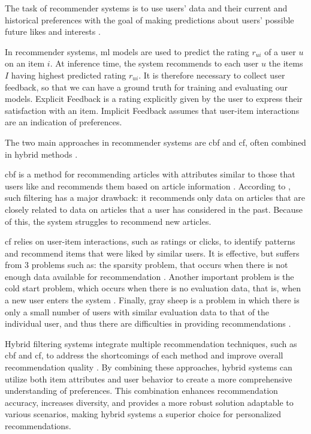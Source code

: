 The task of recommender systems is to use users' data and their current and historical preferences with the goal of making predictions about users' possible future likes and interests \cite{Lu2012}.

In recommender systems, \gls{ml} models are used to predict the rating $r_{ui}$ of a user $u$ on an item $i$.
At inference time, the system recommends to each user $u$ the items $I$ having highest predicted rating $r_{ui}$.
It is therefore necessary to collect user feedback, so that we can have a ground truth for training and evaluating our models.
Explicit Feedback is a rating explicitly given by the user to express their satisfaction with an item.
Implicit Feedback assumes that user-item interactions are an indication of preferences.

The two main approaches in recommender systems are \gls{cbf} and \gls{cf}, often combined in hybrid methods \cite{Ko2022}.

\gls{cbf} is a method for recommending articles with attributes similar to those that users like and recommends them based on article information \cite{Vallet2006}.
According to \textcite{salter2006cinemascreen}, such filtering has a major drawback: it recommends only data on articles that are closely related to data on articles that a user has considered in the past. Because of this, the system struggles to recommend new articles. 

\gls{cf} relies on user-item interactions, such as ratings or clicks, to identify patterns and recommend items that were liked by similar users.
It is effective, but suffers from 3 problems such as: the sparsity problem, that occurs when there is not enough data available for recommendation \cite{Plexousakis2005}.
Another important problem is the cold start problem, which occurs when there is no evaluation data, that is, when a new user enters the system \cite{WEI201729}.
Finally, gray sheep is a problem in which there is only a small number of users with similar evaluation data to that of the individual user, and thus there are difficulties in providing recommendations \cite{Gras2016}.

Hybrid filtering systems integrate multiple recommendation techniques, such as \gls{cbf} and \gls{cf}, to address the shortcomings of each method and improve overall recommendation quality \cite{Ko2022}.
By combining these approaches, hybrid systems can utilize both item attributes and user behavior to create a more comprehensive understanding of preferences.
This combination enhances recommendation accuracy, increases diversity, and provides a more robust solution adaptable to various scenarios, making hybrid systems a superior choice for personalized recommendations.

